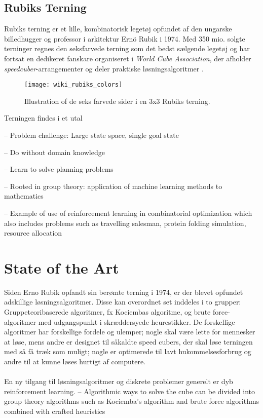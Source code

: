 \documentclass[../main.tex]{subfiles}
\begin{document}
\subsection{Rubiks Terning}

Rubiks terning er et lille, kombinatorisk legetøj opfundet af den ungarske billedhugger og professor i arkitektur Ernö Rubik i 1974. Med 350 mio. solgte terninger regnes den seksfarvede terning som det bedst sælgende legetøj og har fortsat en dedikeret fanskare organiseret i \textit{World Cube Association}, der afholder \textit{speedcuber}-arrangementer og deler praktiske løsningsalgoritmer \cite{RubiksWiki}. 
\begin{figure}[H]
	\centering 
	\texttt{[image: wiki\_rubiks\_colors]}
	\caption{Illustration of de seks farvede sider i en 3x3 Rubiks terning.\protect\footnotemark}
\end{figure}
Terningen findes i et utal 





\cite{SolvingNature}



-- Problem challenge: Large state space, single goal state 

-- Do without domain knowledge

-- Learn to solve planning problems

-- Rooted in group theory: application of machine learning methods to mathematics

\cite{RubiksMedium}
-- Example of use of reinforcement learning in combinatorial optimization which also includes problems such as travelling salesman, protein folding simulation, resource allocation

\section{State of the Art}
\cite{RubiksMedium}
Siden Erno Rubik opfandt sin berømte terning i 1974, er der blevet opfundet adskillige løsningsalgoritmer.
Disse kan overordnet set inddeles i to grupper:
Gruppeteoribaserede algoritmer, fx Kociembas algoritme, og brute force-algoritmer med udgangspunkt i skræddersyede heurestikker.
De forskellige algoritmer har forskellige fordele og ulemper;
nogle skal være lette for mennesker at løse, mens andre er designet til såkaldte speed cubers, der skal løse terningen med så få træk som muligt;
nogle er optimerede til lavt hukommelsesforbrug og andre til at kunne løses hurtigt af computere.\\
\\
En ny tilgang til løsningsalgoritmer og diskrete problemer generelt er dyb reinforcement learning.
-- Algorithmic ways to solve the cube can be divided into group theory algorithms such as Kociemba's algorithm and brute force algorithms combined with crafted heuristics
\end{document}
